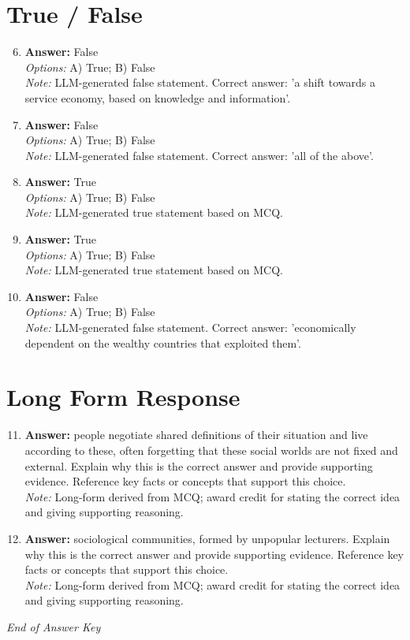 \documentclass[12pt]{article}
\begin{document}
\section*{True / False}
\begin{enumerate}[label=\arabic*.]
\setcounter{enumi}{5}
\item \textbf{Answer:} False
\\ \textit{Options:} A) True; B) False
\\ \textit{Note:} LLM-generated false statement. Correct answer: 'a shift towards a service economy, based on knowledge and information'.
\item \textbf{Answer:} False
\\ \textit{Options:} A) True; B) False
\\ \textit{Note:} LLM-generated false statement. Correct answer: 'all of the above'.
\item \textbf{Answer:} True
\\ \textit{Options:} A) True; B) False
\\ \textit{Note:} LLM-generated true statement based on MCQ.
\item \textbf{Answer:} True
\\ \textit{Options:} A) True; B) False
\\ \textit{Note:} LLM-generated true statement based on MCQ.
\item \textbf{Answer:} False
\\ \textit{Options:} A) True; B) False
\\ \textit{Note:} LLM-generated false statement. Correct answer: 'economically dependent on the wealthy countries that exploited them'.
\end{enumerate}

\section*{Long Form Response}
\begin{enumerate}[label=\arabic*.]
\setcounter{enumi}{10}
\item \textbf{Answer:} people negotiate shared definitions of their situation and live according to these, often forgetting that these social worlds are not fixed and external. Explain why this is the correct answer and provide supporting evidence. Reference key facts or concepts that support this choice.
\\ \textit{Note:} Long-form derived from MCQ; award credit for stating the correct idea and giving supporting reasoning.
\item \textbf{Answer:} sociological communities, formed by unpopular lecturers. Explain why this is the correct answer and provide supporting evidence. Reference key facts or concepts that support this choice.
\\ \textit{Note:} Long-form derived from MCQ; award credit for stating the correct idea and giving supporting reasoning.
\end{enumerate}

\vfill
\noindent\textit{End of Answer Key}
\end{document}
